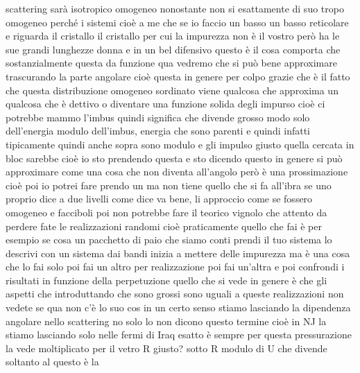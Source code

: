 scattering sarà isotropico omogeneo nonostante non si esattamente di suo tropo omogeneo perché i sistemi cioè a me che se io faccio un basso un basso reticolare e riguarda il cristallo il cristallo per cui la impurezza non è il vostro però ha le sue grandi lunghezze donna e in un bel difensivo questo è il cosa comporta che sostanzialmente questa da funzione qua vedremo che si può bene approximare trascurando la parte angolare cioè questa in genere per colpo grazie che è il fatto che questa distribuzione omogeneo sordinato viene qualcosa che approxima un qualcosa che è dettivo o diventare una funzione solida degli impurso cioè ci potrebbe mammo l'imbus quindi significa che divende grosso modo solo dell'energia modulo dell'imbus, energia che sono parenti e quindi infatti tipicamente quindi anche sopra sono modulo e gli impulso giusto quella cercata in bloc sarebbe cioè io sto prendendo questa e sto dicendo questo in genere si può approximare come una cosa che non diventa all'angolo però è una prossimazione cioè poi io potrei fare prendo un ma non tiene quello che si fa all'ibra se uno proprio dice a due livelli come dice va bene, li approccio come se fossero omogeneo e facciboli poi non potrebbe fare il teorico vignolo che attento da perdere fate le realizzazioni randomi cioè praticamente quello che fai è per esempio se cosa un pacchetto di paio che siamo conti prendi il tuo sistema lo descrivi con un sistema dai bandi inizia a mettere delle impurezza ma è una cosa che lo fai solo poi fai un altro per realizzazione poi fai un'altra e poi confrondi i risultati in funzione della perpetuzione quello che si vede in genere è che gli aspetti che introduttando che sono grossi sono uguali a queste realizzazioni non vedete se qua non c'è lo suo cos in un certo senso stiamo lasciando la dipendenza angolare nello scattering no solo lo non dicono questo termine cioè in NJ la stiamo lasciando solo nelle fermi di Iraq esatto è sempre per questa pressurazione la vede moltiplicato per il vetro R giusto? sotto R modulo di U che divende soltanto al questo è la

